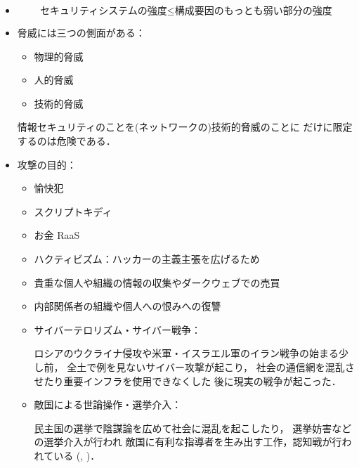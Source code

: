 \begin{itemize}
      攻撃側と守備側の関係：
      \begin{itemize}
         \item 
            (Threat)：情報システムや情報に危害を与えうる状況や事実
         \item 
            (Vulnerability)：情報システムや情報に脅威が影響を与える
            部分があること．
         \item 
            (Risk)：脅威が脆弱性のある情報システムや情報に
            影響を与える確率の度合い．
      \end{itemize}
      リスクは大雑把に以下のように評価できる：
      \[
      \begin{split}
      	&\text{リスク}\\
      	&=\text{情報資産の価値}\times\text{脅威の大きさ}
         	\times\text{脆弱性の度合い}
      \end{split}
      \]
   \item 
   \[
      \text{セキュリティシステムの強度}
      \le
      \text{構成要因のもっとも弱い部分の強度}
   \]
   \item 
      脅威には三つの側面がある：
      \begin{itemize}
         \item 物理的脅威 
         \item 人的脅威
         \item 技術的脅威  
      \end{itemize}
      
      情報セキュリティのことを(ネットワークの)技術的脅威のことに
      だけに限定するのは危険である．
      
   \item 
      攻撃の目的：
      \begin{itemize}
         \item 愉快犯
         \item スクリプトキディ
         \item お金 RaaS 
         \item ハクティビズム：ハッカーの主義主張を広げるため
         \item 貴重な個人や組織の情報の収集やダークウェブでの売買
         \item 内部関係者の組織や個人への恨みへの復讐
         \item サイバーテロリズム・サイバー戦争：
         
            ロシアのウクライナ侵攻や米軍・イスラエル軍のイラン戦争の始まる少し前，
            全土で例を見ないサイバー攻撃が起こり，
            社会の通信網を混乱させたり重要インフラを使用できなくした
            後に現実の戦争が起こった．
         
         \item 敵国による世論操作・選挙介入：
         
            民主国の選挙で陰謀論を広めて社会に混乱を起こしたり，
            選挙妨害などの選挙介入が行われ
            敵国に有利な指導者を生み出す工作，認知戦が行われている
            (\cite{Ba}, \cite{NKO})．
      \end{itemize}
\end{itemize}



